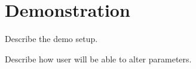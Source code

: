 
\section{Demonstration}

Describe the demo setup. 

Describe how user will be able to alter parameters.
